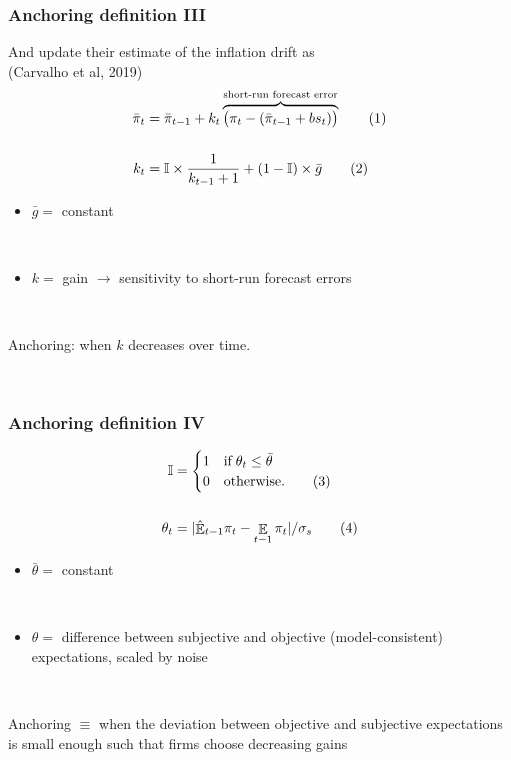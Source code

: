 \documentclass{beamer}
\DeclareMathOperator{\E}{\mathbb{E}}
\newcommand\numberthis{\addtocounter{equation}{1}\tag{\theequation}} %
\begin{document}
\begin{frame}
	\frametitle{Anchoring definition III}
	
And update their estimate of the inflation drift as \\
(Carvalho et al, 2019)
\
\color{red}{CHECK}
 \begin{align*}
\bar{\pi}_{t} & = \bar{\pi}_{t-1} +k_t\overbrace{\big(\pi_{t} -(\bar{\pi}_{t-1}+bs_{t}) \big)}^{\text{short-run forecast error}}  \label{RLS_anchoring} \numberthis \\
\\
k_t &= \mathbb{I} \times \frac{1}{k_{t-1} +1} + (1-\mathbb{I})\times \bar{g} \label{gain} \numberthis\\
\end{align*}

\begin{itemize}
\item[] $\bar{g} =$ constant

\

\item[] $k =$ gain $\rightarrow$ sensitivity to short-run forecast errors
\end{itemize}
\

Anchoring: when $k$ decreases over time.

\

\end{frame}

\begin{frame}
	\frametitle{Anchoring definition IV}
	
	
 \begin{align*}
\mathbb{I} & = \begin{cases} 1 \quad \text{if} \; \theta_t \leq \bar{\theta}  \\ 0 \quad \text{otherwise.}\numberthis\\
\end{cases} \\
\\
\theta_t & = |\hat{\E}_{t-1}\pi_t - \E_{t-1}\pi_t| / \sigma_s \label{criterion}\numberthis
\end{align*}

\begin{itemize}
\item[] $\bar{\theta} = $ constant

\

\item[] $\theta = $ difference between subjective and objective (model-consistent) expectations, scaled by noise
\end{itemize}

\

Anchoring $\equiv$ when the deviation between objective and subjective expectations is small enough such that firms choose decreasing gains

\end{frame}
\end{document}
